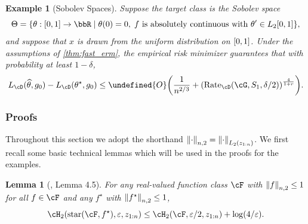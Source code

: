 \documentclass[11pt]{article} %
\newcommand{\pref}[1]{\cref{#1}}
\theoremstyle{theorem}  %
\newtheorem{lemma}{Lemma}
\theoremstyle{plain}
\newtheorem{example}{Example}
\DeclarePairedDelimiter{\brk}{[}{]}
\DeclarePairedDelimiter{\crl}{\{}{\}}
\DeclarePairedDelimiter{\prn}{(}{)}
\DeclarePairedDelimiter{\nrm}{\|}{\|}
\newcommand{\veps}{\varepsilon}
\newcommand{\wt}[1]{\widetilde{#1}}
\newcommand{\wh}[1]{\widehat{#1}}
\let\wt\undefined
\newcommand{\wt}[1]{\widetilde{#1}}
\newcommand{\zr}[1][n]{z_{1:#1}}
\newcommand{\Ot}{\wt{O}}
\newcommand{\poprisk}{L_{\cD}}
\newcommand{\starhull}{\mathrm{star}}
\newcommand{\esttwo}{\wh{\theta}}
\newcommand{\nuisance}{\cG}
\newcommand{\target}{\Theta}
\newcommand{\Rate}{\mathrm{Rate}_{\cD}}
\newcommand{\besttwo}{\theta^{\star}}
\newcommand{\gtone}{g_0}
\newcommand{\sampleone}{S_1}
\begin{document}
\begin{example}[Sobolev Spaces]
\label{ex:sobolev}
Suppose the target class is the Sobolev space
\[
\target = \crl*{\theta:\brk*{0,1}\to\bbR\mid{}\theta(0)=0,\;\textnormal{$f$ is absolutely continuous with $\theta'\in{}L_{2}[0,1]$}},
\]
and suppose that $x$ is drawn from the uniform distribution on $\brk*{0,1}$.
Under the assumptions of \pref{thm:fast_erm}, the empirical risk minimizer guarantees that with probability at least $1-\delta$,
\[
\poprisk(\esttwo,\gtone) - \poprisk(\besttwo,\gtone)
\leq{} \Ot\prn*{\frac{1}{n^{2/3}} + \prn*{\Rate(\nuisance,\sampleone,\delta/2)}^{\frac{4}{1+r}}}.
\]
\end{example}

%
%
\subsubsection{Proofs}\label{app:specific}
Throughout this section we adopt the shorthand
$\nrm*{\cdot}_{n,2}=\nrm*{\cdot}_{L_2(\zr[n])}$. We first recall some
basic technical lemmas which will be used in the proofs for the examples.
\begin{lemma}[\cite{mendelson2002improving}, Lemma 4.5]
\label{lem:star_entropy}
For any real-valued function class $\cF$ with $\nrm*{f}_{n,2}\leq{}1$ for all $f\in\cF$ and any $f^{\star}$ with $\nrm*{f^{\star}}_{n,2}\leq{}1$,
\begin{equation}
\cH_2(\starhull(\cF,f^{\star}),\veps,\zr[n]) \leq{} \cH_2(\cF,\veps/2,\zr[n]) + \log(4/\veps).
\end{equation}
\end{lemma}
\end{document}
